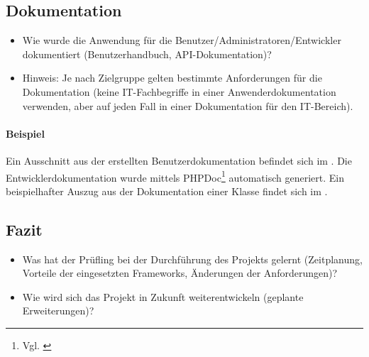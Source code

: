 \subsection{Dokumentation}
\label{sec:Dokumentation}

\begin{itemize}
	\item Wie wurde die Anwendung für die Benutzer/Administratoren/Entwickler dokumentiert (\zB Benutzerhandbuch, \acs{API}-Dokumentation)?
	\item Hinweis: Je nach Zielgruppe gelten bestimmte Anforderungen für die Dokumentation (\zB keine IT-Fachbegriffe in einer Anwenderdokumentation verwenden, aber auf jeden Fall in einer Dokumentation für den IT-Bereich).
\end{itemize}

\paragraph{Beispiel}
Ein Ausschnitt aus der erstellten Benutzerdokumentation befindet sich im .
Die Entwicklerdokumentation wurde mittels PHPDoc\footnote{Vgl. \cite{phpDoc}} automatisch generiert. Ein beispielhafter Auszug aus der Dokumentation einer Klasse findet sich im . 




\subsection{Fazit} 
\label{sec:Fazit}






\begin{itemize}
	\item Was hat der Prüfling bei der Durchführung des Projekts gelernt (\zB Zeitplanung, Vorteile der eingesetzten Frameworks, Änderungen der Anforderungen)?
\end{itemize}



\begin{itemize}
	\item Wie wird sich das Projekt in Zukunft weiterentwickeln (\zB geplante Erweiterungen)?
\end{itemize}



